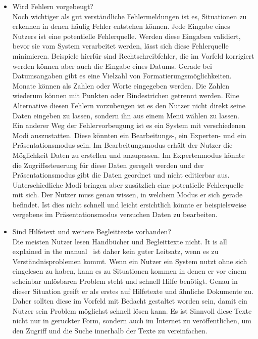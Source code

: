 \begin{description}
\begin{itemize}
\item Wird Fehlern vorgebeugt?\\
Noch wichtiger als gut verständliche Fehlermeldungen ist es, Situationen zu erkennen in denen häufig Fehler entstehen können. Jede Eingabe eines Nutzers ist eine potentielle Fehlerquelle. Werden diese Eingaben validiert, bevor sie vom System verarbeitet werden, lässt sich diese Fehlerquelle minimieren. Beispiele hierfür sind Rechtschreibfehler, die im Vorfeld korrigiert werden können aber auch die Eingabe eines Datums. Gerade bei Datumsangaben gibt es eine Vielzahl von Formatierungsmöglichkeiten. Monate können als Zahlen oder Worte eingegeben werden. Die Zahlen wiederum können mit Punkten oder Bindestrichen getrennt werden. Eine Alternative diesen Fehlern vorzubeugen ist es den Nutzer nicht direkt seine Daten eingeben zu lassen, sondern ihn aus einem Menü wählen zu lassen.\\
Ein anderer Weg der Fehlervorbeugung ist es ein System mit verschiedenen Modi auszustatten. Diese könnten ein Bearbeitungs-, ein Experten- und ein Präsentationsmodus sein. Im Bearbeitungsmodus erhält der Nutzer die Möglichkeit Daten zu erstellen und anzupassen. Im Expertenmodus könnte die Zugriffssteuerung für diese Daten geregelt werden und der Präsentationsmodus gibt die Daten geordnet und nicht editierbar aus. Unterschiedliche Modi bringen aber zusätzlich eine potentielle Fehlerquelle mit sich. Der Nutzer muss genau wissen, in welchem Modus er sich gerade befindet. Ist dies nicht schnell und leicht ersichtlich könnte er beispielsweise vergebens im Präsentationsmodus versuchen Daten zu bearbeiten. \cite[S. 145 ff.]{Nielsen:1994vk}




\item Sind Hilfetext und weitere Begleittexte vorhanden?\\
Die meisten Nutzer lesen Handbücher und Begleittexte nicht. \glqq It is all explained in the manual\grqq\ \cite[S. 149]{Nielsen:1994vk} ist daher kein guter Leitsatz, wenn es zu Verständnisproblemen kommt. Wenn ein Nutzer ein System nutzt ohne sich eingelesen zu haben, kann es zu Situationen kommen in denen er vor einem scheinbar unlösbaren Problem steht und schnell Hilfe benötigt. Genau in dieser Situation greift er als erstes auf Hilfetexte und ähnliche Dokumente zu. Daher sollten diese im Vorfeld mit Bedacht gestaltet worden sein, damit ein Nutzer sein Problem möglichst schnell lösen kann. Es ist Sinnvoll diese Texte nicht nur in geruckter Form, sondern auch im Internet zu veröffentlichen, um den Zugriff und die Suche innerhalb der Texte zu vereinfachen.\cite[S. 148 ff.]{Nielsen:1994vk}



\end{itemize}
\end{description}
